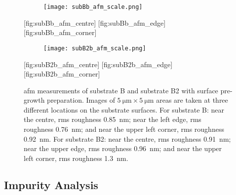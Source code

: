 \begin{figure}[htbp]
    \centering
    \begin{subfigure}[c]{0.032\linewidth}
        \label{fig:subBb_afm_scale}\captionsetup{list=no}
        \texttt{[image: subBb\_afm\_scale.png]}
    \end{subfigure}
    \hfill
    [fig:subBb_afm_centre]%
    \hfill
    [fig:subBb_afm_edge]%
    \hfill
    [fig:subBb_afm_corner] %
    \par\bigskip
    \begin{subfigure}[c]{0.032\linewidth}
        \label{fig:subB2b_afm_scale}\captionsetup{list=no}
        \texttt{[image: subB2b\_afm\_scale.png]}
    \end{subfigure}
    \hfill
    [fig:subB2b_afm_centre]
    \hfill
    [fig:subB2b_afm_edge]
    \hfill
    [fig:subB2b_afm_corner]
    \caption[\Ac{afm} of substrate B and substrate B2 with surface pre-growth preparation.]{\Ac{afm} measurements of substrate B and substrate B2 with surface pre-growth preparation. Images of $\SI{5}{\micro\metre}\times\SI{5}{\micro\metre}$ areas are taken at three different locations on the substrate surfaces. For substrate B:  near the centre, \ac{rms} roughness \SI{0.85}{\nano\metre};  near the left edge, \ac{rms} roughness \SI{0.76}{\nano\metre}; and  near the upper left corner, \ac{rms} roughness \SI{0.92}{\nano\metre}. For substrate B2:  near the centre, \ac{rms} roughness \SI{0.91}{\nano\metre};  near the upper edge, \ac{rms} roughness \SI{0.96}{\nano\metre}; and  near the upper left corner, \ac{rms} roughness \SI{1.3}{\nano\metre}.}\label{fig:subBb_and_subB2_afm}
\end{figure} %


\subsection{Impurity Analysis}

